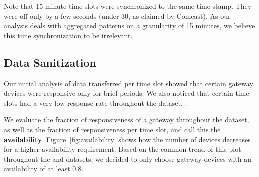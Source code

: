 Note that 15 minute time slots were synchronized to the same time stamp. They were off only by a few seconds (under 30, as claimed by Comcast). As our analysis deals with aggregated patterns on a granularity of 15 minutes, we believe this time synchronization to be irrelevant.

\subsection{Data Sanitization}

Our initial analysis of data transferred per time slot showed that certain gateway devices were responsive only for brief periods. We also noticed that certain time slots had a very low response rate throughout the dataset. .

We evaluate the fraction of responsiveness of a gateway throughout the dataset, as well as the fraction of responsiveness per time slot, and call this the \textbf{availability}. Figure~\ref{fig:availability} shows how the number of devices decreases for a higher availability requirement. Based on the common trend of this plot throughout the \test and \control datasets, we decided to only choose gateway devices with an availability of at least 0.8.


